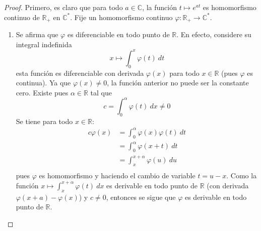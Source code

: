\documentclass[12pt]{report}
\theoremstyle{largebreak}
\newcommand\cf[3]{\ensuremath{#1:#2\rightarrow#3}}
\begin{document}
    \begin{proof}
        Primero, es claro que para todo $a\in\mathbb{C}$, la función $t\mapsto e^{at}$ es homomorfismo continuo de $\mathbb{R}_+$ en $\mathbb{C}^*$. Fije un homomorfismo continuo $\cf{\varphi}{\mathbb{R}_+}{\mathbb{C}^*}$.
        \begin{enumerate}
            \item Se afirma que $\varphi$ es diferenciable en todo punto de $\mathbb{R}$. En efecto, considere su integral indefinida
            \begin{equation*}
                x\mapsto \int_{0}^x \varphi(t)\:dt
            \end{equation*}
            esta función es diferenciable con derivada $\varphi(x)$ para todo $x\in\mathbb{R}$ (pues $\varphi$ es continua). Ya que $\varphi(x)\neq0$, la función anterior no puede ser la constante cero. Existe pues $\alpha\in\mathbb{R}$ tal que
            \begin{equation*}
                c=\int_0^\alpha\varphi(t)\:dx\neq0
            \end{equation*}
            Se tiene para todo $x\in\mathbb{R}$:
            \begin{equation*}
                \begin{split}
                    c\varphi(x)&=\int_0^{\alpha}\varphi(x)\varphi(t)\:dt\\
                    &=\int_0^{\alpha}\varphi(x+t)\:dt\\
                    &=\int_x^{x+\alpha}\varphi(u)\:du\\
                \end{split}
            \end{equation*}
            pues $\varphi$ es homomorfismo y haciendo el cambio de variable $t=u-x$. Como la función $x\mapsto \int_{x}^{x+\alpha}\varphi(t)\:dx$ es derivable en todo punto de $\mathbb{R}$ (con derivada $\varphi(x+a)-\varphi(x)$) y $c\neq0$, entonces se sigue que $\varphi$ es derivable en todo punto de $\mathbb{R}$.


\end{enumerate}
\end{proof}
\end{document}
